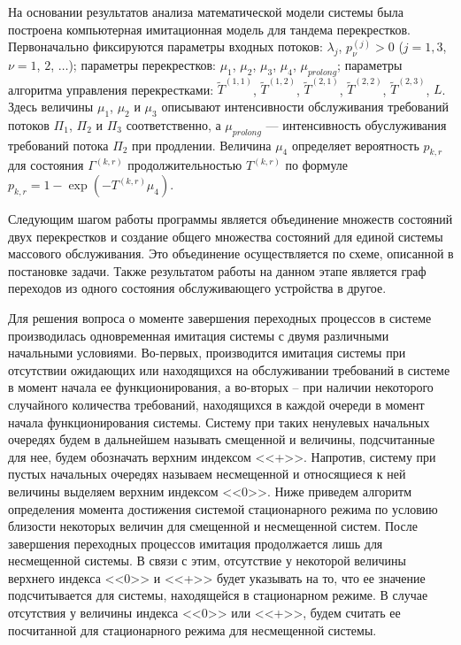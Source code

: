\documentclass[a4paper,12pt,russian]{extarticle}
\begin{document}
На основании результатов анализа математической модели системы была построена компьютерная имитационная модель для тандема перекрестков. Первоначально фиксируются параметры входных потоков:
$\lambda_j$,  $p_{\nu}^{(j)}>0$ ($j=1,3$, $\nu=1$, $2$, $\ldots$); параметры перекрестков: $\mu_1$, $\mu_2$,  $\mu_3$, $\mu_4$, $\mu_{prolong}$; параметры алгоритма управления перекрестками: $\widetilde T^{(1,1)}$, $\widetilde T^{(1,2)}$, $\widetilde T^{(2,1)}$, $\widetilde T^{(2,2)}$, $\widetilde T^{(2,3)}$, $L$. Здесь величины $\mu_1$, $\mu_2$ и $\mu_3$  описывают интенсивности обслуживания требований потоков $\Pi_1$, $\Pi_2$ и $\Pi_3$ соответственно, а $\mu_{prolong}$ --- интенсивность обуслуживания требований потока $\Pi_2$ при продлении. Величина $\mu_4$ определяет вероятность $p_{k,r}$ для состояния $\Gamma^{(k,r)}$ продолжительностью $T^{(k,r)}$ по формуле $p_{k,r} = 1- \exp{(- T^{(k,r)} \mu_4)}$.  

Следующим шагом работы программы является объединение множеств состояний двух перекрестков и создание общего множества состояний для единой системы массового обслуживания. Это объединение осуществляется по схеме, описанной в постановке задачи. Также результатом работы на данном этапе является граф переходов из одного состояния обслуживающего устройства в другое.

Для решения вопроса о моменте завершения переходных процессов в системе производилась одновременная имитация системы с двумя различными начальными условиями. Во-первых, производится имитация системы при отсутствии ожидающих или находящихся на обслуживании требований в системе в момент начала ее функционирования, а во-вторых -- при наличии некоторого случайного количества требований, находящихся в каждой очереди  в момент начала функционирования системы. Систему при таких ненулевых начальных очередях будем в дальнейшем называть смещенной и величины, подсчитанные для нее, будем обозначать верхним индексом <<+>>. Напротив, систему при пустых начальных очередях называем несмещенной и относящиеся к ней величины выделяем верхним индексом <<0>>. Ниже приведем алгоритм определения момента достижения системой стационарного режима по условию близости некоторых величин для смещенной и несмещенной систем. После завершения переходных процессов имитация продолжается лишь для несмещенной системы. В связи с этим, отсутствие у некоторой величины верхнего индекса <<0>> и <<+>> будет указывать на то, что ее значение подсчитывается для системы, находящейся в стационарном режиме. В случае отсутствия у величины индекса <<0>> или <<+>>, будем считать ее посчитанной для стационарного режима для несмещенной системы.
\end{document}
